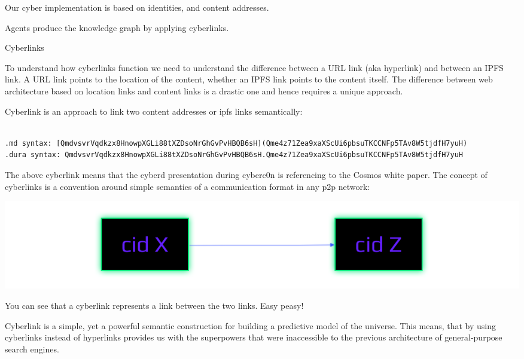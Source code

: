 \documentclass[8pt,oneside]{amsart}
\makeatletter
\newcommand{\linkred}[2]{\href{#1}{\color{red}{#2}}}
\renewcommand\subsection{\@startsection{subsection}
                                    {2}{\z@}
                                    {-3.25ex\@plus -1ex \@minus -.2ex}
                                    {0ex \@plus .2ex}
                                    {\play\Large}
                        }
\newcommand{\titleSection}[1]{\subsection{#1}}
\newcommand{\code}[1]{{\PlayBold #1}}
\newenvironment{Figure}
  {\par\medskip\noindent\minipage{\linewidth}}
  {\endminipage\par\medskip}
\makeatother
\begin{document}
Our \code{cyber} implementation is based on \linkred{https://github.com/cosmos/cosmos-sdk}{cosmos-SDK} identities, and \linkred{https://github.com/multiformats/cid#cidv0}{CIDV1} content addresses.

Agents produce the knowledge graph by applying \code{cyberlinks}.

\titleSection{Cyberlinks}\label{cyberlinks}

To understand how cyberlinks function we need to understand the difference between a URL link (aka hyperlink) and between an IPFS link. A URL link points to the location of the content, whether an IPFS link points to the content itself. The difference between web architecture based on location links and content links is a drastic one and hence requires a unique approach.

{Cyberlink} is an approach to link two content addresses or {ipfs links} semantically:

\begin{lstlisting}

.md syntax: [QmdvsvrVqdkzx8HnowpXGLi88tXZDsoNrGhGvPvHBQB6sH](Qme4z71Zea9xaXScUi6pbsuTKCCNFp5TAv8W5tjdfH7yuH)
.dura syntax: QmdvsvrVqdkzx8HnowpXGLi88tXZDsoNrGhGvPvHBQB6sH.Qme4z71Zea9xaXScUi6pbsuTKCCNFp5TAv8W5tjdfH7yuH
\end{lstlisting}

The above cyberlink means that the cyberd presentation during cyberc0n is referencing to the Cosmos white paper. The concept of cyberlinks is a convention around simple semantics of a communication format in any p2p network:

\begin{Figure}
    \centering
    \includegraphics[width=1\textwidth]{cyberlink.png}
\end{Figure}

You can see that a cyberlink represents a link between the two links. Easy peasy!

Cyberlink is a simple, yet a powerful semantic construction for building a predictive model of the universe. This means, that by using cyberlinks instead of hyperlinks provides us with the superpowers that were inaccessible to the previous architecture of general-purpose search engines.
\end{document}

